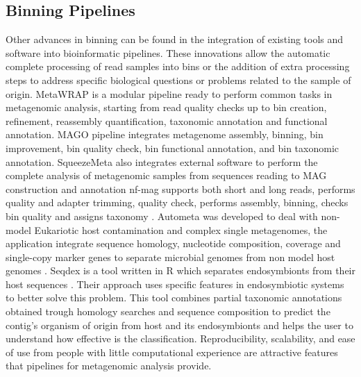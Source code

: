 \documentclass{article}
\begin{document}
\subsection{Binning Pipelines}
Other advances in binning can be found in the integration of existing tools and software into bioinformatic pipelines.
These innovations allow the automatic complete processing of read samples into bins or the addition of extra processing steps to address specific biological questions or problems related to the sample of origin.
MetaWRAP is a modular pipeline ready to perform common tasks in metagenomic analysis, starting from read quality checks up to bin creation, refinement, reassembly quantification, taxonomic annotation and functional annotation.
MAGO pipeline integrates metagenome assembly, binning, bin improvement, bin quality check, bin functional annotation, and bin taxonomic annotation. 
SqueezeMeta also integrates external software to perform the complete analysis of metagenomic samples from sequences reading to \gls{MAG} construction and annotation \cite{tamames2019squeezemeta}
nf-mag supports both short and long reads, performs quality and adapter trimming, quality check,  performs assembly, binning, checks bin quality and assigns taxonomy \cite{ewels2020nf}.
Autometa was developed to deal with non-model Eukariotic host contamination and complex single metagenomes, the application integrate sequence homology, nucleotide composition, coverage and single-copy marker genes to separate microbial genomes from non model host genomes \cite{miller2019autometa}. 
Seqdex is a tool written in R which separates endosymbionts from their host sequences \cite{chiodi2019seqdechi}.
Their approach uses specific features in endosymbiotic systems to better solve this problem.
This tool combines partial taxonomic annotations obtained trough homology searches and sequence composition to predict the contig's organism of origin from host and its endosymbionts and helps the user to understand how effective is the classification.
Reproducibility, scalability, and ease of use from people with little computational experience are attractive features that pipelines for metagenomic analysis provide.
\end{document}
